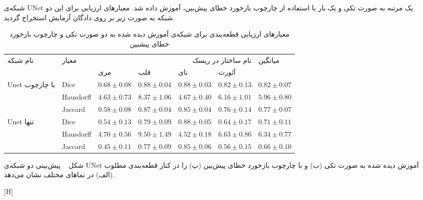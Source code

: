 شبکه‌ی UNet یک‌ مرتبه به صورت تکی و یک بار با استفاده از چارچوب بازخورد خطای پیش‌بین، آموزش داده شد. معیارهای ارزیابی برای این دو شبکه به صورت زیر بر روی دادگان آزمایش استخراج گردید.


\begin{table}[H]
	\caption{معیارهای ارزیابی قطعه‌بندی برای شبکه‌ی آموزش دیده شده به دو صورت تکی و چارچوب بازخورد خطای پیشبین}
	\label{peptableresults}
	\begin{tabular}{lllllll}
		\hline
		\multirow{2}{*}{نام شبکه}      & \multirow{2}{*}{معیار} & \multicolumn{4}{r}{نام ساختار در ریسک}                & \multirow{2}{*}{میانگین} \\ \cline{3-6}
		&                        & مری   & قلب       & نای     & آئورت       &                          \\ \hline
		\multirow{3}{*}{Unet با چارچوب}          & Dice                    & $0.68 \pm 0.08$  & $0.88\pm0.04$   & $0.88\pm0.03$   & $0.82\pm0.13$   & $0.82\pm0.07$                \\ \cline{2-7} 
		& Hausdorff                   & $4.63\pm0.73$   & $8.37\pm1.06$   & $4.67\pm0.40$   & $6.16\pm1.01$   & $5.96\pm0.80$                \\ \cline{2-7} 
		& Jaccard                  & $0.58\pm0.08$   & $0.87\pm0.04$   & $0.85\pm0.04$   & $0.76\pm0.14$   & $0.77\pm0.07$                \\ \hline
		\multirow{3}{*}{Unet تنها} & Dice                   & $0.54 \pm 0.13$ & $0.79 \pm 0.09$ & $0.88 \pm 0.05$ & $0.64 \pm 0.17$ & $0.71\pm0.11$                \\ \cline{2-7} 
		& Hausdorff                  & $4.70 \pm 0.56$ & $9.50 \pm 1.49$ & $4.52 \pm 0.18$ & $6.63 \pm 0.86$ & $6.34\pm0.77$                \\ \cline{2-7} 
		& Jaccard                  & $0.45 \pm 0.11$ & $0.77 \pm 0.09$ & $0.85 \pm 0.06$ & $0.56 \pm 0.15$ & $0.66\pm0.10$                \\ \hline
	\end{tabular}
\end{table}

شکل ~ پیش‌بینی دو شبکه‌ی UNet آموزش دیده شده به صورت تکی (ب) و با چارچوب بازخورد خطای پیش‌بین (پ) را در کنار قطعه‌بندی مطلوب (الف) در نماهای مختلف نشان می‌دهد. 

[H]

